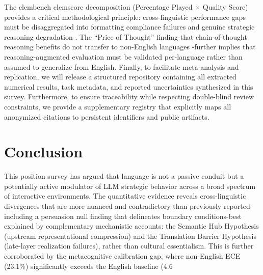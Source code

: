 \documentclass[11pt]{article}
\begin{document}
The clembench clemscore decomposition (Percentage Played $\times$ Quality Score) provides a critical methodological principle: cross-linguistic performance gaps must be disaggregated into formatting compliance failures and genuine strategic reasoning degradation \citep{schlangen2025clembench}. The ``Price of Thought'' finding-that chain-of-thought reasoning benefits do not transfer to non-English languages \citep{hakimov2026pricethought}-further implies that reasoning-augmented evaluation must be validated per-language rather than assumed to generalize from English. Finally, to facilitate meta-analysis and replication, we will release a structured repository containing all extracted numerical results, task metadata, and reported uncertainties synthesized in this survey. Furthermore, to ensure traceability while respecting double-blind review constraints, we provide a supplementary registry that explicitly maps all anonymized citations to persistent identifiers and public artifacts.

\section{Conclusion}
\label{sec:conclusion}

This position survey has argued that language is not a passive conduit but a potentially active modulator of LLM strategic behavior across a broad spectrum of interactive environments. The quantitative evidence reveals cross-linguistic divergences that are more nuanced and contradictory than previously reported-including a persuasion null finding that delineates boundary conditions-best explained by complementary mechanistic accounts: the Semantic Hub Hypothesis (upstream representational compression) and the Translation Barrier Hypothesis (late-layer realization failures), rather than cultural essentialism. This is further corroborated by the metacognitive calibration gap, where non-English ECE (23.1\%) significantly exceeds the English baseline (4.6%
\end{document}
